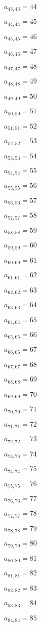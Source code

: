 \documentclass[a4paper,12pt]{article}
\begin{document}
$a _{ 43, 43 } = 44$

$a _{ 44, 44 } = 45$

$a _{ 45, 45 } = 46$

$a _{ 46, 46 } = 47$

$a _{ 47, 47 } = 48$

$a _{ 48, 48 } = 49$

$a _{ 49, 49 } = 50$

$a _{ 50, 50 } = 51$

$a _{ 51, 51 } = 52$

$a _{ 52, 52 } = 53$

$a _{ 53, 53 } = 54$

$a _{ 54, 54 } = 55$

$a _{ 55, 55 } = 56$

$a _{ 56, 56 } = 57$

$a _{ 57, 57 } = 58$

$a _{ 58, 58 } = 59$

$a _{ 59, 59 } = 60$

$a _{ 60, 60 } = 61$

$a _{ 61, 61 } = 62$

$a _{ 62, 62 } = 63$

$a _{ 63, 63 } = 64$

$a _{ 64, 64 } = 65$

$a _{ 65, 65 } = 66$

$a _{ 66, 66 } = 67$

$a _{ 67, 67 } = 68$

$a _{ 68, 68 } = 69$

$a _{ 69, 69 } = 70$

$a _{ 70, 70 } = 71$

$a _{ 71, 71 } = 72$

$a _{ 72, 72 } = 73$

$a _{ 73, 73 } = 74$

$a _{ 74, 74 } = 75$

$a _{ 75, 75 } = 76$

$a _{ 76, 76 } = 77$

$a _{ 77, 77 } = 78$

$a _{ 78, 78 } = 79$

$a _{ 79, 79 } = 80$

$a _{ 80, 80 } = 81$

$a _{ 81, 81 } = 82$

$a _{ 82, 82 } = 83$

$a _{ 83, 83 } = 84$

$a _{ 84, 84 } = 85$
\end{document}
